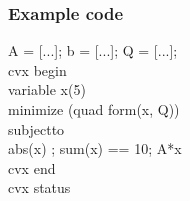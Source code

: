 \documentclass{beamer}
\begin{document}






\begin{frame}
\frametitle{Example code}

A = [...]; b = [...]; Q = [...];\\
cvx begin\\
\: variable x(5)\\
\:  minimize (quad form(x, Q))\\
    subjectto\\
        abs(x) ; sum(x) == 10; A*x \\
cvx end\\
cvx status\\

\end{frame}

\end{document}
